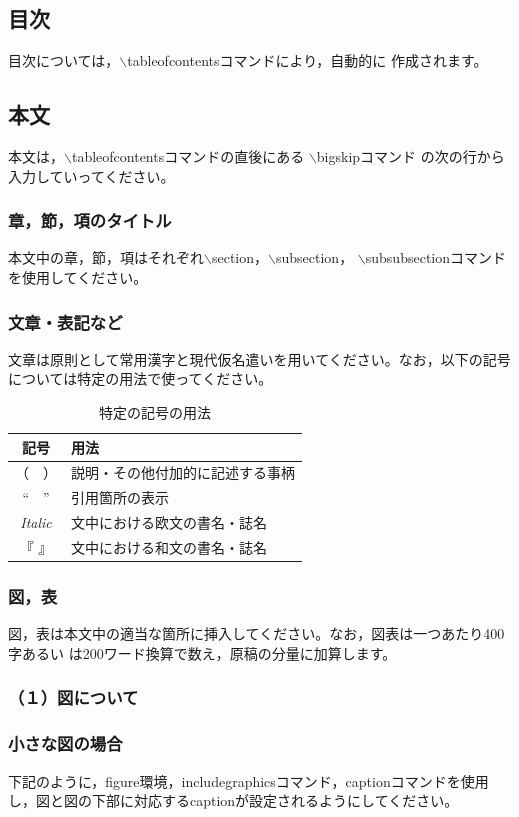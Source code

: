 \documentclass[b5paper,10pt,twocolumn,tombow]{jarticle}
\begin{document}
\subsection{目次}
目次については，$\backslash$tableofcontents{}コマンドにより，自動的に
作成されます。
\subsection{本文}
本文は，$\backslash$tableofcontentsコマンドの直後にある
$\backslash$bigskipコマンド
の次の行から入力していってください。
\subsubsection{章，節，項のタイトル}
本文中の章，節，項はそれぞれ$\backslash$section{}，$\backslash$subsection{}，
$\backslash$subsubsection{}コマンドを使用してください。

\subsubsection{文章・表記など}
文章は原則として常用漢字と現代仮名遣いを用いてください。なお，以下の記号
については特定の用法で使ってください。
\begin{table}[h!]
  \center
  \small
  \begin{tabular}{cl}
    \toprule
    記号 & 用法 \\
    \midrule
    （　） & 説明・その他付加的に記述する事柄 \\
    ``　'' & 引用箇所の表示 \\
    \textit{Italic} & 文中における欧文の書名・誌名 \\
    『 』 & 文中における和文の書名・誌名 \\
    \bottomrule
  \end{tabular}
  \caption{特定の記号の用法}
\end{table}
\normalsize


\subsubsection{図，表}
図，表は本文中の適当な箇所に挿入してください。なお，図表は一つあたり400字あるい
は200ワード換算で数え，原稿の分量に加算します。

\subsubsection*{（１）図について}
\subsubsection*{小さな図の場合}
下記のように，figure環境，includegraphicsコマンド，captionコマンドを使用
し，図と図の下部に対応するcaptionが設定されるようにしてください。
\end{document}
